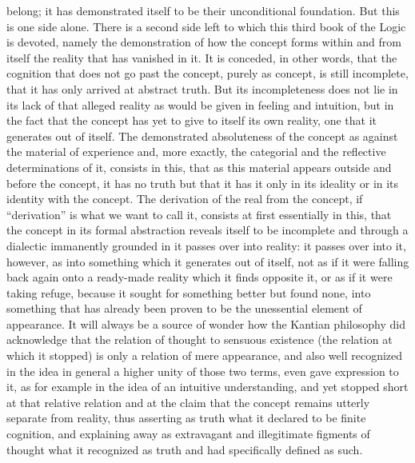 belong; it has demonstrated itself to be their unconditional foundation. But
this is one side alone.
There is a second side left to which this third book of
the Logic is devoted, namely the demonstration of how the concept forms
within and from itself the reality that has vanished in it.
 It is conceded, in
other words, that the cognition that does not go past the concept, purely
as concept, is still incomplete, that it has only arrived at abstract truth. But
its incompleteness does not lie in its lack of that alleged reality as would be
given in feeling and intuition,
 but in the fact that the concept has yet to give
to itself its own reality, one that it generates out of itself.
The demonstrated
absoluteness of the concept as against the material of experience and, more
exactly, the categorial and the reflective determinations of it,
consists in
this, that as this material appears outside and before the concept,
it has no truth but that it has it only in its ideality
or in its identity with the concept.
The derivation of the real from the concept,
if “derivation” is what we want to call it,
consists at first essentially in this,
that the concept in its
formal abstraction reveals itself to be incomplete and through a dialectic
immanently grounded in it passes over into reality:
it passes over into it, however, as into something
which it generates out of itself,
not as if it were falling back again onto a ready-made reality
which it finds opposite it,
or as if it were taking refuge,
because it sought for something better
but found none, into something that has already been proven to be the
unessential element of appearance.
It will always be a source of wonder
how the Kantian philosophy did acknowledge
that the relation of thought to sensuous existence
(the relation at which it stopped)
is only a relation of mere appearance,
and also well recognized in the idea in general
a higher unity of those two terms,
even gave expression to it,
as for example in the idea
of an intuitive understanding,
and yet stopped short at that relative relation
and at the claim that the concept
remains utterly separate from reality,
thus asserting as truth
what it declared to be finite cognition,
and explaining away as extravagant
and illegitimate figments of thought
what it recognized as truth
and had specifically defined as such.

